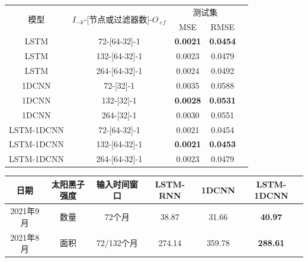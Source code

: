 \begin{table}[!htbp]
  \centering
  \label{tab:ss_area_out_1}
  \footnotesize
  \renewcommand{\arraystretch}{1}
  \begin{tabular}{ccccc}
    \toprule
    \multirow{2}{*}{模型} & \multirow{2}{*}{$I_{-k}$-[节点或过滤器数]-$O_{+f}$} & \multicolumn{2}{c}{测试集}\\
    \cmidrule(lr){3-4}
    \noalign{\smallskip}
    & & MSE & RMSE\\
    \midrule 
    LSTM & 72-[64-32]-1 & \textbf{0.0021} & \textbf{0.0454} \\
    LSTM & 132-[64-32]-1 & 0.0023 & 0.0479 \\
    LSTM & 264-[64-32]-1 & 0.0024 & 0.0492 \\
    \hline
    1DCNN & 72-[32]-1 & 0.0035 & 0.0588 \\
    1DCNN & 132-[32]-1 & \textbf{0.0028} & \textbf{0.0531} \\
    1DCNN & 264-[32]-1 & 0.0030 & 0.0551 \\
    \hline
    LSTM-1DCNN & 72-[64-32]-1 & 0.0021 & 0.0454 \\
    LSTM-1DCNN & 132-[64-32]-1 & \textbf{0.0021} & \textbf{0.0453} \\
    LSTM-1DCNN & 264-[64-32]-1 & 0.0023 & 0.0479 \\
    \bottomrule
\end{tabular}
\end{table}

\begin{table}[!htbp]
  \centering
  \label{tab:ss_out_1}
  \footnotesize
  \begin{tabular}{cccccc}
      \toprule
      日期 & 太阳黑子强度 & 输入时间窗口 & LSTM-RNN & 1DCNN & LSTM-1DCNN  \\
      \midrule
      2021年9月 & 数量 & 72个月 & 38.87 & 31.66 & \textbf{40.97} \\
      2021年8月 & 面积 & 72/132个月 & 274.14 & 359.78 & \textbf{288.61} \\
      \bottomrule
    \end{tabular}
  \end{table}

